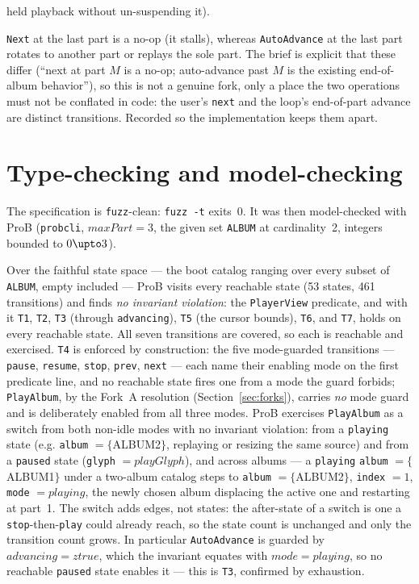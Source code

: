 \documentclass[a4paper,10pt,fleqn]{article}
\begin{document}
\begin{description}
    held playback without un-suspending it).
  \item[Fork~C --- next at $M$ stalls; auto-advance at $M$ wraps.] \texttt{Next}
    at the last part is a no-op (it stalls), whereas \texttt{AutoAdvance} at the
    last part rotates to another part or replays the sole part. The brief is
    explicit that these differ (``next at part $M$ is a no-op; auto-advance past
    $M$ is the existing end-of-album behavior''), so this is not a genuine fork,
    only a place the two operations must not be conflated in code: the user's
    \texttt{next} and the loop's end-of-part advance are distinct transitions.
    Recorded so the implementation keeps them apart.
\end{description}

\section{Type-checking and model-checking}
\label{sec:results}

The specification is \texttt{fuzz}-clean: \texttt{fuzz -t} exits~0. It was then
model-checked with ProB (\texttt{probcli}, $maxPart = 3$, the given set
\texttt{ALBUM} at cardinality~2, integers bounded to $0 \upto 3$).

Over the faithful state space --- the boot catalog ranging over every subset of
\texttt{ALBUM}, empty included --- ProB visits every reachable state (53 states,
461 transitions) and finds \emph{no invariant violation}: the \texttt{PlayerView}
predicate, and with it \texttt{T1}, \texttt{T2}, \texttt{T3} (through
\texttt{advancing}), \texttt{T5} (the cursor bounds), \texttt{T6}, and
\texttt{T7}, holds on every reachable state. All seven transitions are covered,
so each is reachable and exercised. \texttt{T4} is enforced by construction: the
five mode-guarded transitions --- \texttt{pause}, \texttt{resume}, \texttt{stop},
\texttt{prev}, \texttt{next} --- each name their enabling mode on the first
predicate line, and no reachable state fires one from a mode the guard forbids;
\texttt{PlayAlbum}, by the Fork~A resolution (Section~\ref{sec:forks}), carries
\emph{no} mode guard and is deliberately enabled from all three modes. ProB
exercises \texttt{PlayAlbum} as a switch from both non-idle modes with no
invariant violation: from a \texttt{playing} state (e.g. \texttt{album} $=
\{$ALBUM2$\}$, replaying or resizing the same source) and from a \texttt{paused}
state (\texttt{glyph} $= playGlyph$), and across albums --- a \texttt{playing}
\texttt{album} $= \{$ALBUM1$\}$ under a two-album catalog steps to
\texttt{album} $= \{$ALBUM2$\}$, \texttt{index} $= 1$, \texttt{mode} $=
playing$, the newly chosen album displacing the active one and restarting at
part~1. The switch adds edges, not states: the after-state of a switch is one a
\texttt{stop}-then-\texttt{play} could already reach, so the state count is
unchanged and only the transition count grows. In particular \texttt{AutoAdvance}
is guarded by $advancing = ztrue$, which the invariant equates with $mode =
playing$, so no reachable \texttt{paused} state enables it --- this is
\texttt{T3}, confirmed by exhaustion.
\end{document}
